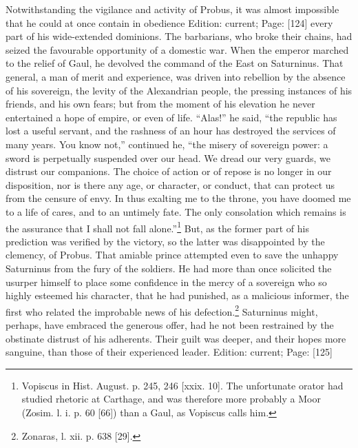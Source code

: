 Notwithstanding the vigilance and activity of Probus, it was almost impossible that he could at once contain in obedience Edition: current; Page: [124] every part of his wide-extended dominions. The barbarians, who broke their chains, had seized the favourable opportunity of a domestic war. When the emperor marched to the relief of Gaul, he devolved the command of the East on Saturninus. That general, a man of merit and experience, was driven into rebellion by the absence of his sovereign, the levity of the Alexandrian people, the pressing instances of his friends, and his own fears; but from the moment of his elevation he never entertained a hope of empire, or even of life. \texthebrew{“}Alas!\texthebrew{}” he said, \texthebrew{“}the republic has lost a useful servant, and the rashness of an hour has destroyed the services of many years. You know not,\texthebrew{}” continued he, \texthebrew{“}the misery of sovereign power: a sword is perpetually suspended over our head. We dread our very guards, we distrust our companions. The choice of action or of repose is no longer in our disposition, nor is there any age, or character, or conduct, that can protect us from the censure of envy. In thus exalting me to the throne, you have doomed me to a life of cares, and to an untimely fate. The only consolation which remains is the assurance that I shall not fall alone.\texthebrew{}”\footnote{Vopiscus in Hist. August. p. 245, 246 [xxix. 10]. The unfortunate orator had studied rhetoric at Carthage, and was therefore more probably a Moor (Zosim. l. i. p. 60 [66]) than a Gaul, as Vopiscus calls him.} But, as the former part of his prediction was verified by the victory, so the latter was disappointed by the clemency, of Probus. That amiable prince attempted even to save the unhappy Saturninus from the fury of the soldiers. He had more than once solicited the usurper himself to place some confidence in the mercy of a sovereign who so highly esteemed his character, that he had punished, as a malicious informer, the first who related the improbable news of his defection.\footnote{Zonaras, l. xii. p. 638 [29].} Saturninus might, perhaps, have embraced the generous offer, had he not been restrained by the obstinate distrust of his adherents. Their guilt was deeper, and their hopes more sanguine, than those of their experienced leader.
Edition: current; Page: [125]

